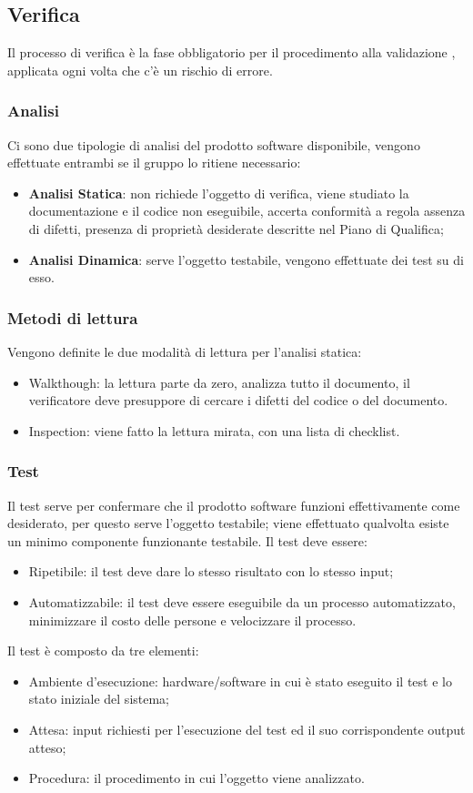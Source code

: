 \subsection{Verifica}
Il processo di verifica è la fase obbligatorio per il procedimento alla validazione , applicata ogni volta che c’è un rischio di errore.
\subsubsection{Analisi}
Ci sono due tipologie di analisi del prodotto software disponibile, vengono effettuate entrambi se il gruppo lo ritiene necessario:
\begin{itemize}
\item \textbf{Analisi Statica}: non richiede l’oggetto di verifica, viene studiato la documentazione e il codice non eseguibile, accerta conformità a regola assenza di 			difetti, presenza di proprietà desiderate descritte nel Piano di Qualifica;
\item \textbf{Analisi Dinamica}: serve l’oggetto testabile, vengono effettuate dei test su di esso.
\end{itemize}

\subsubsection{Metodi di lettura}
Vengono definite le due modalità di lettura per l’analisi statica:
\begin{itemize}
\item Walkthough: la lettura parte da zero, analizza tutto il documento, il verificatore deve presuppore di cercare i difetti del codice o del documento.
\item Inspection: viene fatto la lettura mirata, con una lista di checklist.
\end{itemize}

\subsubsection{Test}
Il test serve per confermare che il prodotto software funzioni effettivamente come desiderato, per questo serve l’oggetto testabile; viene effettuato qualvolta esiste un minimo componente funzionante testabile.
Il test deve essere: 
\begin{itemize}
\item Ripetibile: il test deve dare lo stesso risultato con lo stesso input;
\item Automatizzabile: il test deve essere eseguibile da un processo automatizzato, minimizzare il costo delle persone e velocizzare il processo.
\end{itemize}
Il test è composto da tre elementi:
\begin{itemize}
\item Ambiente d’esecuzione: hardware/software in cui è stato eseguito il test e lo stato iniziale del sistema;
\item Attesa: input richiesti per l’esecuzione del test ed il suo corrispondente output atteso;
\item Procedura: il procedimento in cui l’oggetto viene analizzato.
\end{itemize}

